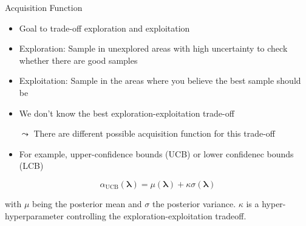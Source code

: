\documentclass[aspectratio=169]{../latex_main/tntbeamer}  %
\newcommand{\conf}[0]{\pmb{\lambda}}
\begin{document}
\begin{frame}[c]{Acquisition Function}

\begin{itemize}
    \item Goal to trade-off exploration and exploitation
    \item \alert{Exploration:} Sample in unexplored areas with high uncertainty to check whether there are good samples
    \item \alert{Exploitation:} Sample in the areas where you believe the best sample should be
    \smallskip
    \item We don't know the best exploration-exploitation trade-off
    \item[$\leadsto$] There are different possible acquisition function for this trade-off
    \smallskip
    \item For example, upper-confidence bounds (UCB) or lower confidenec bounds (LCB)
\end{itemize}

\begin{equation}
    \alpha_{\text{UCB}} (\conf) = \mu(\conf) + \kappa \sigma(\conf)
\end{equation}

with $\mu$ being the posterior mean and $\sigma$ the posterior variance.
$\kappa$ is a hyper-hyperparameter controlling the exploration-exploitation tradeoff.

\end{frame}

\end{document}
